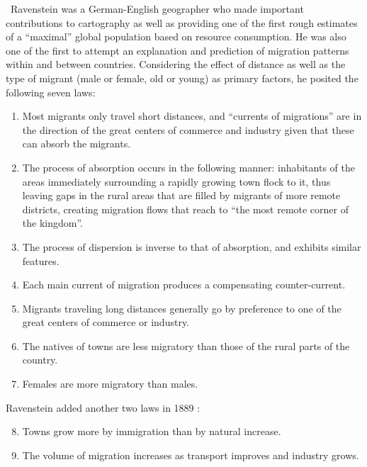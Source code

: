 ~Ravenstein was a German-English geographer who made important contributions to cartography as well as providing one of the first rough estimates of a ``maximal'' global population based on resource consumption. He was also one of the first to attempt an explanation and prediction of migration patterns within and between countries. Considering the effect of distance as well as the type of migrant (male or female, old or young) as primary factors, he posited the following seven laws:
\begin{enumerate}
\item Most migrants only travel short distances, and ``currents of migrations'' are in the direction of the great centers of commerce and industry given that these can absorb the migrants.
\item The process of absorption occurs in the following manner: inhabitants of the areas immediately surrounding a rapidly growing town flock to it, thus leaving gaps in the rural areas that are filled by migrants of more remote districts, creating migration flows that reach to ``the most remote corner of the kingdom''.
\item The process of dispersion is inverse to that of absorption, and exhibits similar features.
\item Each main current of migration produces a compensating counter-current.
\item Migrants traveling long distances generally go by preference to one of the great centers of commerce or industry.
\item The natives of towns are less migratory than those of the rural parts of the country.
\item Females are more migratory than males.
\end{enumerate}
Ravenstein added another two laws in 1889 \cite{ravenstein_1889_laws}: 
\begin{enumerate}
  \setcounter{enumi}{7}
\item Towns grow more by immigration than by natural increase.
\item The volume of migration increases as transport improves and industry grows.
\end{enumerate}
%


